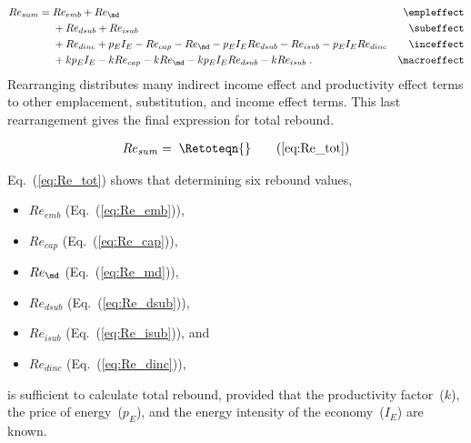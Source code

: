 \begin{align}
  Re_{sum} = \; &Re_{emb} + Re_{\md}      & \mathrm{\empleffect}                           \nonumber \\
                &+ Re_{dsub} + Re_{isub}   & \mathrm{\subeffect}                            \nonumber \\
                &+ Re_{dinc} + p_E I_E - Re_{cap} - Re_{\md} - p_E I_E Re_{dsub} 
                             - Re_{isub} - p_E I_E Re_{dinc}   & \mathrm{\inceffect}        \nonumber \\
                &+ k p_E I_E - k Re_{cap} - k Re_{\md} - k p_E I_E Re_{dsub} - k Re_{isub} \; .  & \mathrm{\macroeffect}
\end{align}
%
Rearranging distributes many indirect income effect and productivity effect terms 
to other emplacement, substitution, and income effect terms.
This last rearrangement gives the final expression for total rebound.

\begin{align}
  Re_{sum} = \; \Retoteqn{} \tag{\ref{eq:Re_tot}}
\end{align}

Eq.~(\ref{eq:Re_tot}) shows that determining six rebound values,

\begin{itemize}

  \item $Re_{emb}$ (Eq.~(\ref{eq:Re_emb})), 

  \item $Re_{cap}$ (Eq.~(\ref{eq:Re_cap})), 
  
  \item $Re_{\md}$ (Eq.~(\ref{eq:Re_md})),
  
  \item $Re_{dsub}$ (Eq.~(\ref{eq:Re_dsub})),
  
  \item $Re_{isub}$ (Eq.~(\ref{eq:Re_isub})), and
  
  \item $Re_{dinc}$ (Eq.~(\ref{eq:Re_dinc})),

\end{itemize}
%
is sufficient to calculate total rebound, 
provided that 
the productivity factor~($k$),
the price of energy~($p_E$), and
the energy intensity of the economy~($I_E$) 
are known.
